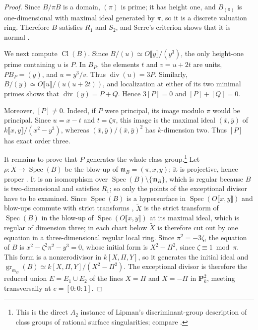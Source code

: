 \documentclass[10pt]{amsart}
\DeclareMathOperator{\Cl}{Cl}
\DeclareMathOperator{\Spec}{Spec}
\theoremstyle{remark}
\begin{document}
\begin{proof}
	
	
	Since $B/\pi B$ is a
	domain, $(\pi)$ is prime; it has height one, and
	$B_{(\pi)}$ is one-dimensional with maximal ideal generated by $\pi$,
	so it is a discrete valuation ring.  Therefore $B$ satisfies $R_1$ and
	$S_2$, and Serre's criterion shows that it is normal
	\cite[Tag~031O]{StacksProject}.
	
	
		We next compute \(\Cl(B)\).  Since
	\(B/(u)\simeq O\llbracket y\rrbracket/(y^3)\), the only height-one
	prime containing \(u\) is \(P\).  In \(B_P\), the elements \(t\) and
	\(v=u+2t\) are units, \(PB_P=(y)\), and \(u=y^3/v\).  Thus
	\(\operatorname{div}(u)=3P\).  Similarly,
	\(B/(y)\simeq O\llbracket u\rrbracket/(u(u+2t))\), and localization
	at either of its two minimal primes shows that
	\(\operatorname{div}(y)=P+Q\).  Hence \(3[P]=0\) and
	\([P]+[Q]=0\).
	
	Moreover, \([P]\ne0\).  Indeed, if \(P\) were principal, its image
	modulo \(\pi\) would be principal.  Since \(u=x-t\) and \(t=\zeta\pi\),
	this image is the maximal ideal
	\((\bar x,\bar y)\) of
	\(k\llbracket x,y\rrbracket/(x^2-y^3)\), whereas
	\((\bar x,\bar y)/(\bar x,\bar y)^2\) has \(k\)-dimension two.
	Thus \([P]\) has exact order three.
	
	It remains to prove that \(P\) generates the whole class group.\footnote{This is the direct \(A_2\) instance of Lipman's
		discriminant-group description of class groups of rational surface
		singularities; compare
		\cite[Prop.~17.1]{LipmanRationalSingularities}.}
	Let
	\(\rho\colon\widetilde X\to\Spec(B)\) be the blow-up of
	\(\mathfrak m_B=(\pi,x,y)\); it is projective, hence proper \cite[Tag~02NS]{StacksProject}.  It is an
	isomorphism over \(\Spec(B)\setminus\{\mathfrak m_B\}\), which is
	regular because \(B\) is two-dimensional and satisfies \(R_1\); so only
	the points of the exceptional divisor have to be examined.  Since
	\(\Spec(B)\) is a hypersurface in \(\Spec(O\llbracket x,y\rrbracket)\)
	and blow-ups commute with strict transforms \cite[Tag~080E]{StacksProject}, \(\widetilde X\) is the
	strict transform of \(\Spec(B)\) in the blow-up of
	\(\Spec(O\llbracket x,y\rrbracket)\) at its maximal ideal, which is
	regular of dimension three; in each chart below \(\widetilde X\) is
	therefore cut out by one equation in a three-dimensional regular local
	ring.  Since
	\(\pi^2=-3\zeta\), the equation of \(B\) is
	\(x^2-\zeta^2\pi^2-y^3=0\), whose initial form is \(X^2-\Pi^2\), since \(\zeta\equiv1\bmod\pi\).  This
	form is a nonzerodivisor in \(k[X,\Pi,Y]\), so it generates the initial
	ideal and
	\(\operatorname{gr}_{\mathfrak m_B}(B)\simeq k[X,\Pi,Y]/(X^2-\Pi^2)\).
	The exceptional divisor is therefore the reduced
	union \(E=E_1\cup E_2\) of the lines \(X=\Pi\) and \(X=-\Pi\) in
	\(\mathbf P^2_k\), meeting transversally at
	\(e=[0:0:1]\).
	

\end{proof}
\end{document}
